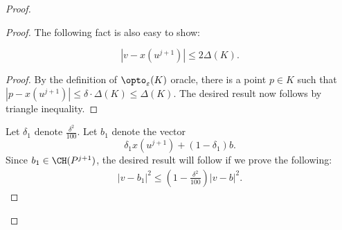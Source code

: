 \begin{proof}
\begin{proof}
The following fact is also easy to show:
\begin{fact}
    \label{fact:easy}
$$ |v-x(u^{j+1})| \leq 2 \Delta(K).$$
\end{fact}
\begin{proof}
    By the definition of $\opto_\varepsilon(K)$ oracle, there is a point $p \in K$ such that $|p-x(u^{j+1})| \leq \delta \cdot \Delta(K) \leq \Delta(K)$. The desired result now follows by triangle inequality. 
\end{proof}

 Let  $\delta_1$ denote $\frac{\delta^2}{100}$. Let $b_1$ denote the vector
 $$ \delta_1 x(u^{j+1}) + (1-\delta_1)b. $$
 Since $b_1 \in \CH(P^{j+1})$, the desired result will follow if we prove the following:
 \begin{align}
     \label{eq:tech4}
     |v-b_1|^2 \leq \left(1- \frac{\delta^2}{100} \right) |v-b|^2. 
 \end{align}


\end{proof}
\end{proof}
